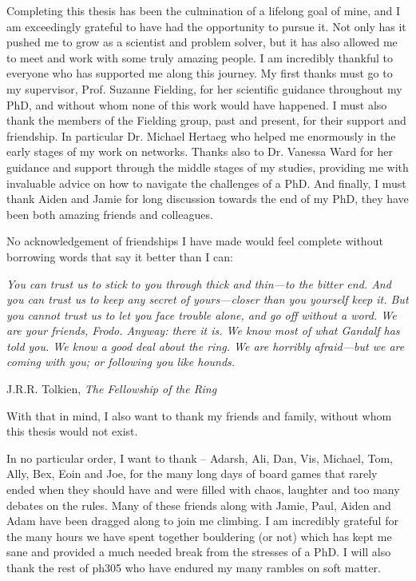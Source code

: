 Completing this thesis has been the culmination of a lifelong goal of mine, and I am exceedingly grateful to have had the opportunity to pursue it. Not only has it pushed me to grow as a scientist and problem solver, but it has also allowed me to meet and work with some truly amazing people. I am incredibly thankful to everyone who has supported me along this journey. 
My first thanks must go to my supervisor, Prof. Suzanne Fielding, for her scientific guidance throughout my PhD, and without whom none of this work would have happened. I must also thank the members of the Fielding group, past and present, for their support and friendship. In particular Dr. Michael Hertaeg who helped me enormously in the early stages of my work on networks. Thanks also to Dr. Vanessa Ward for her guidance and support through the middle stages of my studies, providing me with invaluable advice on how to navigate the challenges of a PhD. And finally, I must thank Aiden and Jamie for long discussion towards the end of my PhD, they have been both amazing friends and colleagues. 

No acknowledgement of friendships I have made would feel complete without borrowing words that say it better than I can:
\begin{center}
\vspace{0.5\baselineskip}
\begin{minipage}{0.86\textwidth}
\begin{singlespace}
\itshape
You can trust us to stick to you through thick and thin---to the bitter end. And you can trust us to keep any secret of yours---closer than you yourself keep it. But you cannot trust us to let you face trouble alone, and go off without a word. We are your friends, Frodo. Anyway: there it is. We know most of what Gandalf has told you. We know a good deal about the ring. We are horribly afraid---but we are coming with you; or following you like hounds.

\raggedleft
J.R.R. Tolkien, \emph{The Fellowship of the Ring}
\end{singlespace}
\end{minipage}
\vspace{0.5\baselineskip}
\end{center}

With that in mind, I also want to thank my friends and family, without whom this thesis would not exist. 

In no particular order, I want to thank -- Adarsh, Ali, Dan, Vis, Michael, Tom, Ally, Bex, Eoin and Joe, for the many long days of board games that rarely ended when they should have and were filled with chaos, laughter and too many debates on the rules. Many of these friends along with Jamie, Paul, Aiden and Adam have been dragged along to join me climbing. I am incredibly grateful for the many hours we have spent together bouldering (or not) which has kept me sane and provided a much needed break from the stresses of a PhD. I will also thank the rest of ph305 who have endured my many rambles on soft matter.

